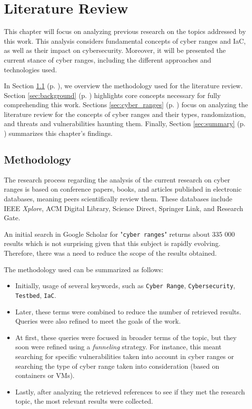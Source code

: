 \chapter{Literature Review} \label{chap:sota}

\minitoc

This chapter will focus on analyzing previous research on the topics addressed by this work. This analysis considers fundamental concepts of cyber ranges and IaC, as well as their impact on cybersecurity. Moreover, it will be presented the current stance of cyber ranges, including the different approaches and technologies used.

In Section \ref{sec:methodology} (p. \pageref{sec:methodology}), we overview the methodology used for the literature review. Section \ref{sec:background} (p. \pageref{sec:background}) highlights core concepts necessary for fully comprehending this work. Sections \ref{sec:cyber_ranges} (p. \pageref{sec:cyber_ranges}) focus on analyzing the literature review for the concepts of cyber ranges and their types, randomization, and threats and vulnerabilities haunting them. Finally, Section \ref{sec:summary} (p. \pageref{sec:summary}) summarizes this chapter's findings.

\section{Methodology} \label{sec:methodology}

The research process regarding the analysis of the current research on cyber ranges is based on conference papers, books, and articles published in electronic databases, meaning peers scientifically review them. These databases include IEEE \textit{Xplore}, ACM Digital Library, Science Direct, Springer Link, and Research Gate.

An initial search in Google Scholar for "\texttt{cyber ranges}" returns about 335 000 results which is not surprising given that this subject is rapidly evolving. Therefore, there was a need to reduce the scope of the results obtained.

The methodology used can be summarized as follows:

\begin{itemize}
    \item Initially, usage of several keywords, such as \texttt{Cyber Range}, \texttt{Cybersecurity}, \texttt{Testbed}, \texttt{IaC}.
    \item Later, these terms were combined to reduce the number of retrieved results. Queries were also refined to meet the goals of the work.
    \item At first, these queries were focused in broader terms of the topic, but they soon were refined using a \textit{funneling} strategy. For instance, this meant searching for specific vulnerabilities taken into account in cyber ranges or searching the type of cyber range taken into consideration (based on containers or VMs).
    \item Lastly, after analyzing the retrieved references to see if they met the research topic, the most relevant results were collected.
\end{itemize}

